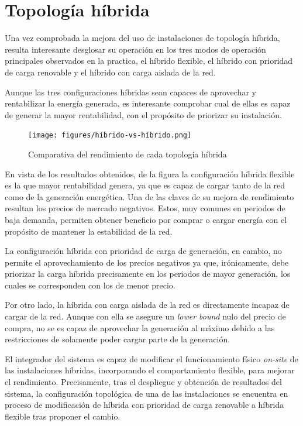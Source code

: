 \section{Topología híbrida}
\label{makereference7.4}

Una vez comprobada la mejora del uso de instalaciones de topología híbrida, resulta interesante desglosar su operación en los tres modos de operación principales observados en la practica, el híbrido flexible, el híbrido con prioridad de carga renovable y el híbrido con carga aislada de la red.

Aunque las tres configuraciones híbridas sean capaces de aprovechar y rentabilizar la energía generada, es interesante comprobar cual de ellas es capaz de generar la mayor rentabilidad, con el propósito de priorizar su instalación.

\begin{figure}
\centering
\texttt{[image: figures/híbrido-vs-híbrido.png]}
\caption{Comparativa del rendimiento de cada topología híbrida}
\label{fig:híbrido-vs-híbrido}
\end{figure}

En vista de los resultados obtenidos, de la figura  la configuración híbrida flexible es la que mayor rentabilidad genera, ya que es capaz de cargar tanto de la red como de la generación energética. Una de las claves de su mejora de rendimiento resultan los precios de mercado negativos. Estos, muy comunes en periodos de baja demanda, permiten obtener beneficio por comprar o cargar energía con el propósito de mantener la estabilidad de la red.

La configuración híbrida con prioridad de carga de generación, en cambio, no permite el aprovechamiento de los precios negativos ya que, irónicamente, debe priorizar la carga híbrida precisamente en los periodos de mayor generación, los cuales se corresponden con los de menor precio.

Por otro lado, la híbrida con carga aislada de la red es directamente incapaz de cargar de la red. Aunque con ella se asegure un \textit{lower bound} nulo del precio de compra, no se es capaz de aprovechar la generación al máximo debido a las restricciones de solamente poder cargar parte de la generación.

El integrador del sistema es capaz de modificar el funcionamiento físico \textit{on-site} de las instalaciones híbridas, incorporando el comportamiento flexible, para mejorar el rendimiento. Precisamente, tras el despliegue y obtención de resultados del sistema, la configuración topológica de una de las instalaciones se encuentra en proceso de modificación de híbrida con prioridad de carga renovable a híbrida flexible tras proponer el cambio.

